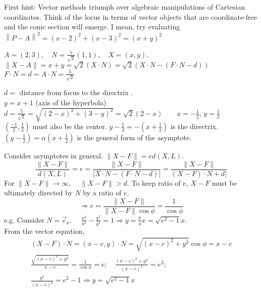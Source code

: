 \documentclass[twoside]{amsart}
\theoremstyle{plain}
\theoremstyle{definition}
\newcommand{\exercisehead}[1]
  {\smallskip
   \noindent{\small\bf Exercise #1.}}
\begin{document}
\exercisehead{18} First hint: Vector methods triumph over algebraic manipulations of Cartesian coordinates.  Think of the locus in terms of vector objects that are coordinate-free and the conic section will emerge.  I mean, try evaluating $\left\| P -A \right\|^2 = (x-2)^2 + (x-3)^2 = (x+y)^2$

$A=(2,3), \quad N = \frac{1}{\sqrt{2}} (1,1), \quad X = (x,y)$.  \medskip \\
$ \| X - A \| = x + y = \sqrt{2} (X\cdot N ) = \sqrt{2} ( X \cdot N - (F \cdot N - d ))$ \medskip \\
 $F \cdot N = d = A \cdot N = \frac{5}{\sqrt{2}}$

$d = \text{ distance from focus to the directrix }$.  \medskip \\
$y = x + 1 $ (axis of the hyperbola) \medskip \\
$d = \frac{5}{ \sqrt{2}} = \sqrt{ (2-x)^2 + (3-y)^2 } = \sqrt{2} (2-x) \quad \quad x = -\frac{1}{2}, \, y = \frac{1}{2}$ \medskip \\
$\left( \frac{-1}{2}, \frac{1}{2} \right)$ must also be the center.  $y-\frac{1}{2} = - \left( x + \frac{1}{2} \right)$ is the directrix.  \medskip \\
$ \left( y - \frac{1}{2} \right) = \alpha \left( x + \frac{1}{2} \right)$ is the general form of the asymptote.  

Consider asymptotes in general.  $\| X - F \| = e d(X,L)$.  
\[
\frac{ \| X - F \| }{ d(X,L) } = e = \frac{ \| X - F \| }{ | X\cdot N - (F\cdot N - d ) | } = \frac{ \| X - F \| }{ (X-F)\cdot N + d | }
\]
For $\| X - F \| \to \infty$, $\quad \| X - F \| > d$.  To keep ratio of $e$, $X-F$ must be ultimately directed by $N$ by a ratio of $e$.  
\[
\Longrightarrow e = \frac{ \| X - F \| }{ \| X - F \| \cos{\phi} } = \frac{1}{ \cos{\phi}}
\]
e.g. Consider $N = \vec{e}_x$.  $\quad \frac{x^2}{a^2} - \frac{y^2}{b^2} =1 \Longrightarrow y = \frac{b}{a}x = \sqrt{e^2-1} x $.  
\medskip \\
From the vector equation,
\[
\begin{gathered}
  (X-F) \cdot N = (x-c,y)\cdot N = \sqrt{ (x-c)^2 +y^2 }\cos{\phi} = x - c \\
  \frac{ \sqrt{ (x-c)^2 +y^2 }}{ x-c} = \frac{1}{ \cos{\phi}} = e; \quad \frac{ (x-c)^2 + y^2 }{ (x-c)^2 } = e^2 ; \\
  \frac{y^2}{ (x-c)^2 } = e^2 - 1 \Longrightarrow y = \sqrt{ e^2 - 1 } x 
\end{gathered}
\]
\end{document}

